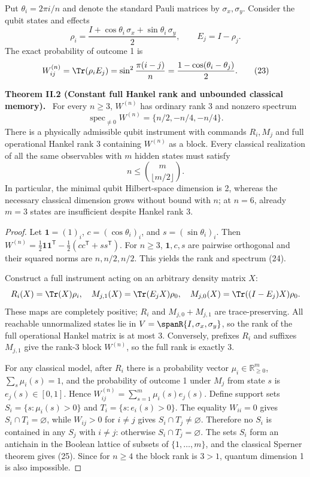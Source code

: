 \documentclass[11pt,a4paper,oneside]{book}
\newcommand{\R}{\mathbb R}\newcommand{\C}{\mathbb C}\newcommand{\Z}{\mathbb Z}\newcommand{\N}{\mathbb N}\newcommand{\Q}{\mathbb Q}
\newcommand{\one}{\mathbf 1}\newcommand{\ii}{\mathrm i}\newcommand{\dd}{\mathrm d}
\DeclareMathOperator{\spec}{spec}\DeclareMathOperator{\diag}{diag}
\newcommand{\statement}[3]{\par\medskip\noindent\textbf{#1 #2 (#3).}\ }
\begin{document}
Put $\theta_i=2\pi i/n$ and denote the standard Pauli matrices by $\sigma_x,\sigma_y$. Consider the qubit states and effects
\begin{equation}\rho_i=\frac{I+\cos\theta_i\,\sigma_x+\sin\theta_i\,\sigma_y}{2},\qquad E_j=I-\rho_j.\tag{22}\end{equation}
The exact probability of outcome 1 is
\begin{equation}W^{(n)}_{ij}=\Tr(\rho_iE_j)=\sin^2\frac{\pi(i-j)}n=\frac{1-\cos(\theta_i-\theta_j)}2.\tag{23}\end{equation}
\statement{Theorem}{II.2}{Constant full Hankel rank and unbounded classical memory} For every $n\ge3$, $W^{(n)}$ has ordinary rank 3 and nonzero spectrum
\begin{equation}\spec_{\ne0}W^{(n)}=\{n/2,-n/4,-n/4\}.\tag{24}\end{equation}
There is a physically admissible qubit instrument with commands $R_i,M_j$ and full operational Hankel rank 3 containing $W^{(n)}$ as a block. Every classical realization of all the same observables with $m$ hidden states must satisfy
\begin{equation}n\le\binom m{\lfloor m/2\rfloor}.\tag{25}\end{equation}
In particular, the minimal qubit Hilbert-space dimension is 2, whereas the necessary classical dimension grows without bound with $n$; at $n=6$, already $m=3$ states are insufficient despite Hankel rank 3.
\begin{proof}Let $\one=(1)_i$, $c=(\cos\theta_i)_i$, and $s=(\sin\theta_i)_i$. Then $W^{(n)}=\frac12\one\one^{\mathsf T}-\frac12(cc^{\mathsf T}+ss^{\mathsf T})$. For $n\ge3$, $\one,c,s$ are pairwise orthogonal and their squared norms are $n,n/2,n/2$. This yields the rank and spectrum (24).

Construct a full instrument acting on an arbitrary density matrix $X$:
\[R_i(X)=\Tr(X)\rho_i,\quad M_{j,1}(X)=\Tr(E_jX)\rho_0,\quad M_{j,0}(X)=\Tr((I-E_j)X)\rho_0.\]
These maps are completely positive; $R_i$ and $M_{j,0}+M_{j,1}$ are trace-preserving. All reachable unnormalized states lie in $V=\spanR\{I,\sigma_x,\sigma_y\}$, so the rank of the full operational Hankel matrix is at most 3. Conversely, prefixes $R_i$ and suffixes $M_{j,1}$ give the rank-3 block $W^{(n)}$, so the full rank is exactly 3.

For any classical model, after $R_i$ there is a probability vector $\mu_i\in\R_{\ge0}^m$, $\sum_s\mu_i(s)=1$, and the probability of outcome 1 under $M_j$ from state $s$ is $e_j(s)\in[0,1]$. Hence $W^{(n)}_{ij}=\sum_{s=1}^m\mu_i(s)e_j(s)$. Define support sets $S_i=\{s:\mu_i(s)>0\}$ and $T_i=\{s:e_i(s)>0\}$. The equality $W_{ii}=0$ gives $S_i\cap T_i=\varnothing$, while $W_{ij}>0$ for $i\ne j$ gives $S_i\cap T_j\ne\varnothing$. Therefore no $S_i$ is contained in any $S_j$ with $i\ne j$: otherwise $S_i\cap T_j=\varnothing$. The sets $S_i$ form an antichain in the Boolean lattice of subsets of $\{1,\ldots,m\}$, and the classical Sperner theorem gives (25). Since for $n\ge4$ the block rank is $3>1$, quantum dimension 1 is also impossible.\end{proof}
\end{document}
